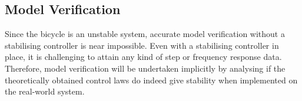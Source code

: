 \subsection{Model Verification}
Since the bicycle is an unstable system, accurate model verification without a stabilising controller is near impossible. Even with a stabilising controller in place, it is challenging to attain any kind of step or frequency response data. Therefore, model verification will be undertaken implicitly by analysing if the theoretically obtained control laws do indeed give stability when implemented on the real-world system.